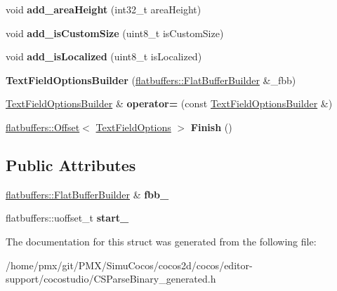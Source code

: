\begin{DoxyCompactItemize}
\mbox{\label{structflatbuffers_1_1TextFieldOptionsBuilder_a6fe49680ffc16d086a014b2a84e83b91}} 
void {\bfseries add\+\_\+area\+Height} (int32\+\_\+t area\+Height)
\item 
\mbox{\label{structflatbuffers_1_1TextFieldOptionsBuilder_a6a4822c4c3b717346be2b60e5a54571b}} 
void {\bfseries add\+\_\+is\+Custom\+Size} (uint8\+\_\+t is\+Custom\+Size)
\item 
\mbox{\label{structflatbuffers_1_1TextFieldOptionsBuilder_a1313dd54b657c3f63de4e7f2f1ac9a38}} 
void {\bfseries add\+\_\+is\+Localized} (uint8\+\_\+t is\+Localized)
\item 
\mbox{\label{structflatbuffers_1_1TextFieldOptionsBuilder_a455b8be842bd8a8e785cd41a12e1fc51}} 
{\bfseries Text\+Field\+Options\+Builder} (\hyperlink{classflatbuffers_1_1FlatBufferBuilder}{flatbuffers\+::\+Flat\+Buffer\+Builder} \&\+\_\+fbb)
\item 
\mbox{\label{structflatbuffers_1_1TextFieldOptionsBuilder_a60854e997ea37b065206e390e4e8b1d9}} 
\hyperlink{structflatbuffers_1_1TextFieldOptionsBuilder}{Text\+Field\+Options\+Builder} \& {\bfseries operator=} (const \hyperlink{structflatbuffers_1_1TextFieldOptionsBuilder}{Text\+Field\+Options\+Builder} \&)
\item 
\mbox{\label{structflatbuffers_1_1TextFieldOptionsBuilder_ab54cc9c6459f422e73540d5c09a6fbcc}} 
\hyperlink{structflatbuffers_1_1Offset}{flatbuffers\+::\+Offset}$<$ \hyperlink{structflatbuffers_1_1TextFieldOptions}{Text\+Field\+Options} $>$ {\bfseries Finish} ()
\end{DoxyCompactItemize}
\subsection*{Public Attributes}
\begin{DoxyCompactItemize}
\item 
\mbox{\label{structflatbuffers_1_1TextFieldOptionsBuilder_a0fa7d2b5624863c4be568b25cb6c4114}} 
\hyperlink{classflatbuffers_1_1FlatBufferBuilder}{flatbuffers\+::\+Flat\+Buffer\+Builder} \& {\bfseries fbb\+\_\+}
\item 
\mbox{\label{structflatbuffers_1_1TextFieldOptionsBuilder_a9bac81bdcd06e1c45cbad5ab34ad4315}} 
flatbuffers\+::uoffset\+\_\+t {\bfseries start\+\_\+}
\end{DoxyCompactItemize}


The documentation for this struct was generated from the following file\+:\begin{DoxyCompactItemize}
\item 
/home/pmx/git/\+P\+M\+X/\+Simu\+Cocos/cocos2d/cocos/editor-\/support/cocostudio/C\+S\+Parse\+Binary\+\_\+generated.\+h\end{DoxyCompactItemize}
